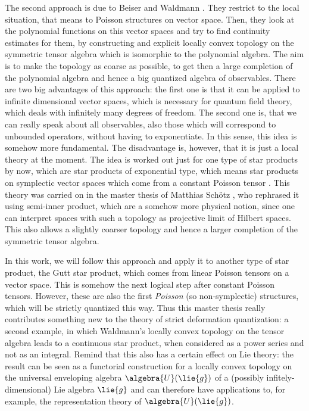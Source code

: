 The second approach is due to Beiser and Waldmann 
\cite{beiser:2011a, beiser.waldmann:2014a}. They restrict to the 
local situation, that means to Poisson structures on vector space. Then, they 
look at the polynomial functions on this vector spaces and try to find 
continuity estimates for them, by constructing and explicit locally convex 
topology on the symmetric tensor algebra which is isomorphic to the polynomial 
algebra. The aim is to make the topology as coarse as possible, to get then a 
large completion of the polynomial algebra and hence a big quantized algebra of 
observables. There are two big advantages of this approach: the first one is 
that it can be applied to infinite dimensional vector spaces, which is necessary 
for quantum field theory, which deals with infinitely many degrees of freedom. 
The second one is, that we can really speak about all observables, also those 
which will correspond to unbounded operators, without having to exponentiate. In 
this sense, this idea is somehow more fundamental. The disadvantage is, however, 
that it is just a local theory at the moment. The idea is worked out just for 
one type of star products by now, which are star products of exponential type, 
which means star products on symplectic vector spaces which come from a constant 
Poisson tensor \cite{waldmann:2014a}. This theory was carried on in the master 
thesis of Matthias Sch\"otz \cite{schoetz:2015a}, who rephrased it using 
semi-inner product, which are a somehow more physical notion, since one can 
interpret spaces with such a topology as projective limit of Hilbert spaces.
This also allows a slightly coarser topology and hence a larger completion of the 
symmetric tensor algebra.


In this work, we will follow this approach and apply it to 
another type of star product, the Gutt star product, which comes from linear 
Poisson tensors on a vector space. This is somehow the next logical step after 
constant Poisson tensors. However, these are also the first \emph{Poisson} (so 
non-symplectic) structures, which will be strictly quantized this way. Thus this 
master thesis really contributes something new to the theory of strict 
deformation quantization: a second example, in which Waldmann's locally convex 
topology on the tensor algebra leads to a continuous star product, when 
considered as a power series and not as an integral. Remind that this also has a 
certain effect on Lie theory: the result can be seen as a functorial 
construction for a locally convex topology on the universal enveloping algebra 
$\algebra{U}(\lie{g})$ of a (possibly infitely-dimensional) Lie algebra 
$\lie{g}$ and can therefore have applications to, for example, the 
representation theory of $\algebra{U}(\lie{g})$.
